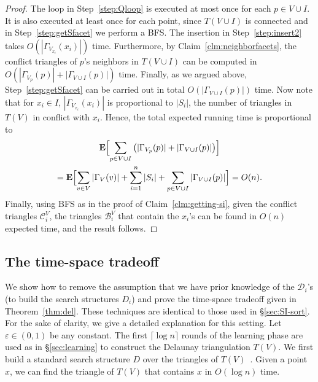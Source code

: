 \documentclass{siamltex}
\newcommand{\D}{\mathcal{D}}
\newcommand{\eps}{\varepsilon}
\newcommand{\EX}{\hbox{\bf E}}
\newcommand{\tsearch}{\mathcal{B}}
\newcommand{\tconf}{\mathcal{C}}
\begin{document}
\begin{proof}
\medskip

The loop in Step~\ref{step:Qloop} is executed at most once for each 
$p \in V \cup I$.
It is also executed at least once for each point, since $T(V \cup I)$ is 
connected
and in Step~\ref{step:getSfacet} we perform a BFS. The insertion in 
Step~\ref{step:insert2} takes $O(|\Gamma_{V_{x_i}}(x_i)|)$ time. 
Furthermore,
by Claim~\ref{clm:neighborfacets}, the conflict triangles 
of $p$'s neighbors in $T(V \cup I)$ can be computed in 
$O(|\Gamma_{V_p}(p)| + |\Gamma_{V \cup I}(p)|)$
time. Finally, as we argued above, Step~\ref{step:getSfacet} can be carried 
out in total $O(|\Gamma_{V \cup I}(p)|)$ time. 
Now note that for $x_i \in I$, $|\Gamma_{V_{x_i}}(x_i)|$ 
is proportional to $|S_i|$, the number of triangles in $T(V)$ in conflict 
with $x_i$. 
Hence, the total expected running time is proportional to
\begin{multline*}
\EX \Bigl[\sum_{p \in V \cup I}\left(|\Gamma_{V_p}(p)| + 
|\Gamma_{V \cup I}(p)|\right) \Bigr]\\
=
\EX\Bigl[\sum_{v \in V} |\Gamma_V(v)| + \sum_{i = 1}^n |S_i| + 
\sum_{p \in V \cup I} |\Gamma_{V \cup I}(p)|\Bigr]
 = O(n).
\end{multline*}
Finally, using BFS as in the proof of Claim~\ref{clm:getting-si}, 
given the conflict triangles $\tconf^V_i$, 
the triangles $\tsearch^V_i$ that contain the $x_i$'s 
can be found in $O(n)$ expected time, 
and the result follows.
\end{proof}

\subsection{The time-space tradeoff}\label{sec:tradeoff}
We show how to remove the assumption that we have prior knowledge of
the $\D_i$'s (to build the search structures $D_i$) and prove
the time-space tradeoff given in Theorem~\ref{thm:del}. These techniques
are identical to those used in \S \ref{sec:SI-sort}.
For the sake of clarity, we give a detailed explanation for this setting.
Let $\eps \in (0,1)$ be any constant. 
The first $\lceil\log n\rceil$ rounds of
the learning phase are used as in \S\ref{sec:learning} 
to construct the Delaunay
triangulation $T(V)$. 
We first build a standard search structure
$D$ over the triangles of $T(V)$~\cite[Chapter~6]{deBergKrOvSc00}. 
Given a point $x$, we can
find the triangle of $T(V)$ that contains $x$ in $O(\log n)$ time.
\end{document}
